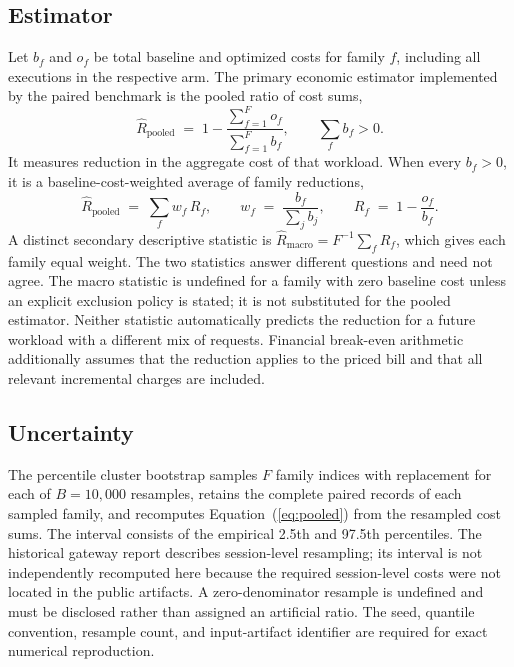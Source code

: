 \documentclass[11pt,a4paper]{article}
\begin{document}
\subsection{Estimator}
Let $b_f$ and $o_f$ be total baseline and optimized costs for family $f$, including all executions
in the respective arm. The primary economic estimator implemented by the paired benchmark is the
pooled ratio of cost sums,
\begin{equation}
\widehat{R}_{\mathrm{pooled}} \;=\; 1 - \frac{\sum_{f=1}^{F} o_f}{\sum_{f=1}^{F} b_f},
\qquad \textstyle\sum_f b_f > 0 .
\label{eq:pooled}
\end{equation}
It measures reduction in the aggregate cost of that workload. When every $b_f>0$, it is a
baseline-cost-weighted average of family reductions,
\begin{equation}
\widehat{R}_{\mathrm{pooled}} \;=\; \sum_f w_f\,R_f, \qquad
w_f \;=\; \frac{b_f}{\sum_j b_j}, \qquad R_f \;=\; 1 - \frac{o_f}{b_f}.
\end{equation}
A distinct secondary descriptive statistic is
$\widehat{R}_{\mathrm{macro}}=F^{-1}\sum_f R_f$, which gives each family equal weight. The two
statistics answer different questions and need not agree. The macro statistic is undefined for a
family with zero baseline cost unless an explicit exclusion policy is stated; it is not
substituted for the pooled estimator. Neither statistic automatically predicts the reduction for
a future workload with a different mix of requests. Financial break-even arithmetic additionally
assumes that the reduction applies to the priced bill and that all relevant incremental charges
are included.

\subsection{Uncertainty}
The percentile cluster bootstrap samples $F$ family indices with replacement for each of
$B=10{,}000$ resamples, retains the complete paired records of each sampled family, and
recomputes Equation~(\ref{eq:pooled}) from the resampled cost sums. The interval consists of the
empirical 2.5th and 97.5th percentiles. The historical gateway report describes session-level
resampling; its interval is not independently recomputed here because the required session-level
costs were not located in the public artifacts. A zero-denominator resample is undefined and must
be disclosed rather than assigned an artificial ratio. The seed, quantile convention, resample
count, and input-artifact identifier are required for exact numerical reproduction.
\end{document}
